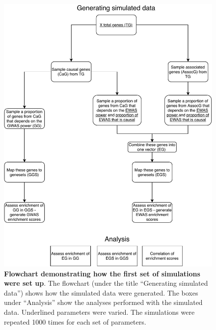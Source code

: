 \documentclass[11pt,twoside]{bristolthesis}
\begin{document}
\begin{figure}[!hp]

{\centering \includegraphics[width=1\linewidth]{figure/06-ewas_gwas_comparison/simulations-gene-up-flowchart} 

}

\caption[Flowchart demonstrating how the first set of simulations were set up]{\textbf{Flowchart demonstrating how the first set of simulations were set up}. The flowchart (under the title ``Generating simulated data'') shows how the simulated data were generated. The boxes under ``Analysis'' show the analyses performed with the simulated data. Underlined parameters were varied. The simulations were repeated 1000 times for each set of parameters.}\label{fig:method-simulations-schematic}
\end{figure}
\end{document}
